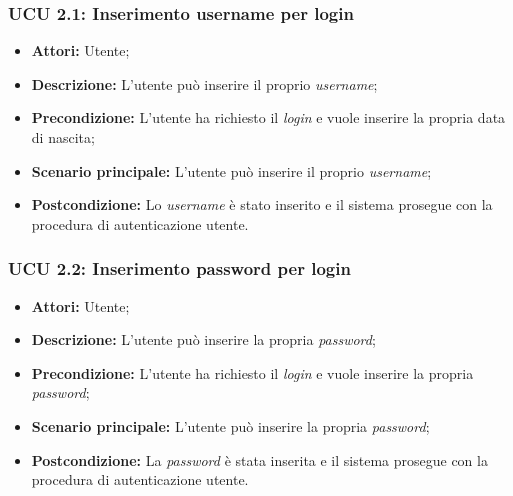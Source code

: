 \hypertarget{U2.1}{}
\subsubsection{UCU 2.1: Inserimento username per login}
\begin{itemize}
\item \textbf{Attori:} Utente;
\item \textbf{Descrizione:} L'utente può inserire il proprio \textit{username};
\item \textbf{Precondizione:} L'utente ha richiesto il \textit{login} e vuole inserire la propria data di nascita;
\item \textbf{Scenario principale:} L'utente può inserire il proprio \textit{username};
\item \textbf{Postcondizione:} Lo \textit{username} è stato inserito e il sistema prosegue con la procedura di autenticazione utente.
\end{itemize}

\hypertarget{U2.2}{}
\subsubsection{UCU 2.2: Inserimento password per login}
\begin{itemize}
\item \textbf{Attori:} Utente;
\item \textbf{Descrizione:} L'utente può inserire la propria \textit{password};
\item \textbf{Precondizione:} L'utente ha richiesto il \textit{login} e vuole inserire la propria \textit{password};
\item \textbf{Scenario principale:} L'utente può inserire la propria \textit{password};
\item \textbf{Postcondizione:} La \textit{password} è stata inserita e il sistema prosegue con la procedura di autenticazione utente.
\end{itemize}

\hypertarget{L0}{}

